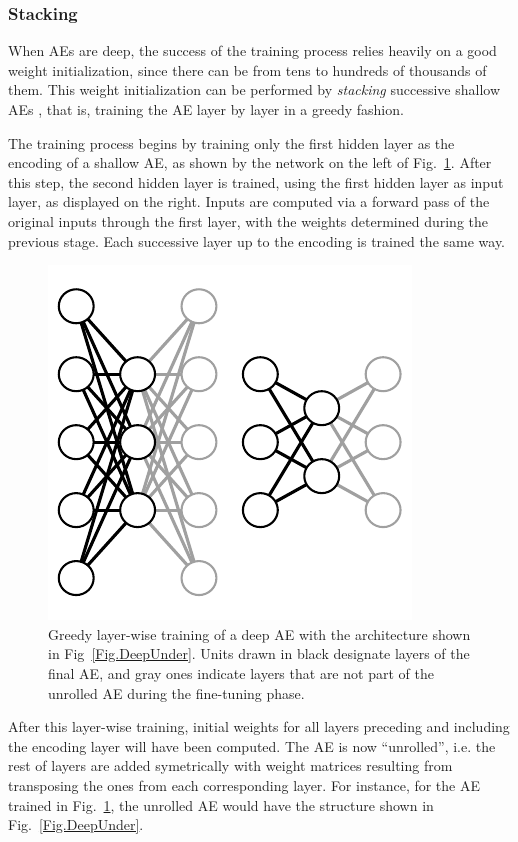 \subsubsection{Stacking}

When AEs are deep, the success of the training process relies heavily on a good weight initialization, since there can be from tens to hundreds of thousands of them. This weight initialization can be performed by \textit{stacking} successive shallow AEs \cite{LayerwiseTraining}, that is, training the AE layer by layer in a greedy fashion.

The training process begins by training only the first hidden layer as the encoding of a shallow AE, as shown by the network on the left of Fig.~\ref{Fig.StackedAutoencoder}. After this step, the second hidden layer is trained, using the first hidden layer as input layer, as displayed on the right. Inputs are computed via a forward pass of the original inputs through the first layer, with the weights determined during the previous stage. Each successive layer up to the encoding is trained the same way.

\begin{figure}[ht!]
  \centering
  \includegraphics{Stacked}
  \caption{\label{Fig.StackedAutoencoder}Greedy layer-wise training of a deep AE with the architecture shown in Fig~\ref{Fig.DeepUnder}. Units drawn in black designate layers of the final AE, and gray ones indicate layers that are not part of the unrolled AE during the fine-tuning phase.}
\end{figure}

After this layer-wise training, initial weights for all layers preceding and including the encoding layer will have been computed. The AE is now ``unrolled'', i.e. the rest of layers are added symetrically with weight matrices resulting from transposing the ones from each corresponding layer. For instance, for the AE trained in Fig.~\ref{Fig.StackedAutoencoder}, the unrolled AE would have the structure shown in Fig.~\ref{Fig.DeepUnder}.

